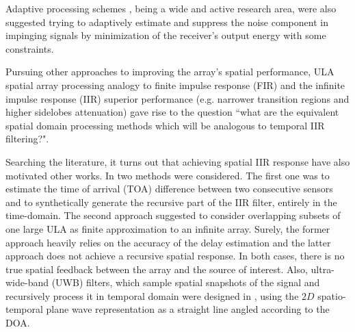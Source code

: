 Adaptive processing schemes \cite{frost1972algorithm,manolakis2000statistical}, being a wide and active  research area, were also suggested trying to adaptively estimate and suppress the noise component in impinging signals by minimization of the receiver's output energy with some constraints.
\par Pursuing other approaches to improving the array's spatial performance, ULA spatial array processing analogy to finite impulse response (FIR) \cite{van1988beamforming} and the infinite impulse response (IIR) superior performance (e.g. narrower transition regions and higher sidelobes attenuation) gave rise to the question ``what are the equivalent spatial domain processing methods which will be analogous to temporal IIR filtering?".
\par Searching the literature, it turns out that achieving spatial IIR response have also motivated other works.
In \cite{wen2013extending} two methods were considered.
The first one was to estimate the time of arrival (TOA) difference between two consecutive sensors and to synthetically generate the recursive part of the IIR filter, entirely in the time-domain. The second approach suggested to consider overlapping subsets of one large ULA as finite approximation to an infinite array. 
Surely, the former approach heavily relies on the accuracy of the delay estimation and the latter approach does not achieve a recursive spatial response. In both cases, there is no true spatial feedback between the array and the source of interest.
Also, ultra-wide-band (UWB) filters, which sample spatial snapshots of the signal and recursively process it in temporal domain were designed in \cite{bruton1983highly}, using the $2D$ spatio-temporal plane wave representation as a straight line angled according to the DOA.
